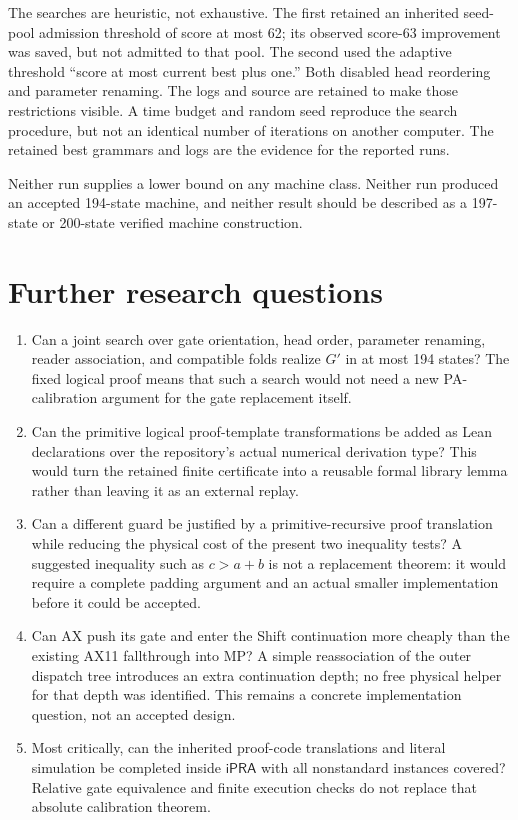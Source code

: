 \documentclass[11pt]{article}
\newcommand{\iPRA}{\mathsf{iPRA}}
\begin{document}
The searches are heuristic, not exhaustive. The first retained an
inherited seed-pool admission threshold of score at most 62; its observed
score-63 improvement was saved, but not admitted to that pool. The second
used the adaptive threshold ``score at most current best plus one.''
Both disabled head reordering and parameter renaming. The logs and source
are retained to make those restrictions visible. A time budget and random
seed reproduce the search procedure, but not an identical number of
iterations on another computer. The retained best grammars and logs are
the evidence for the reported runs.

Neither run supplies a lower bound on any machine class. Neither run
produced an accepted 194-state machine, and neither result should be
described as a 197-state or 200-state verified machine construction.

\section{Further research questions}

\begin{enumerate}
\item Can a joint search over gate orientation, head order, parameter
renaming, reader association, and compatible folds realize $G'$ in at
most 194 states? The fixed logical proof means that such a search would
not need a new PA-calibration argument for the gate replacement itself.
\item Can the primitive logical proof-template transformations be added
as Lean declarations over the repository's actual numerical derivation
type? This would turn the retained finite certificate into a reusable
formal library lemma rather than leaving it as an external replay.
\item Can a different guard be justified by a primitive-recursive proof
translation while reducing the physical cost of the present two
inequality tests? A suggested inequality such as $c>a+b$ is not a
replacement theorem: it would require a complete padding argument and
an actual smaller implementation before it could be accepted.
\item Can AX push its gate and enter the Shift continuation more cheaply
than the existing AX11 fallthrough into MP? A simple reassociation of
the outer dispatch tree introduces an extra continuation depth; no free
physical helper for that depth was identified. This remains a concrete
implementation question, not an accepted design.
\item Most critically, can the inherited proof-code translations and
literal simulation be completed inside $\iPRA$ with all nonstandard
instances covered? Relative gate equivalence and finite execution checks
do not replace that absolute calibration theorem.
\end{enumerate}
\end{document}

